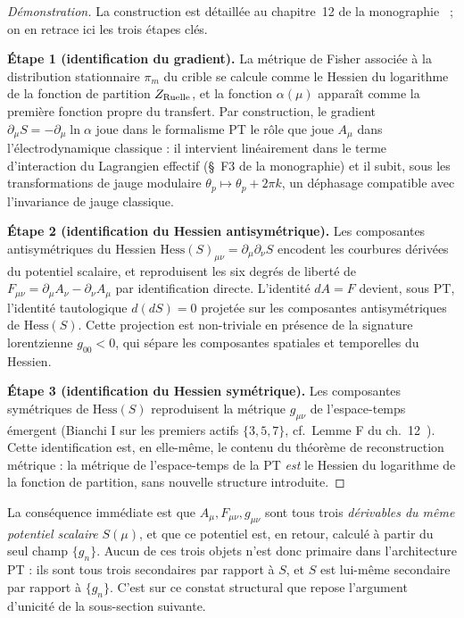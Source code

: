 \begin{proof}[Démonstration]
La construction est détaillée au chapitre~12 de la
monographie~\cite{PT_Monograph} ; on en retrace ici les trois
étapes clés.

\textbf{Étape 1 (identification du gradient).}
La métrique de Fisher associée à la distribution stationnaire
$\pi_m$ du crible se calcule comme le Hessien du logarithme de la
fonction de partition $Z_{\rm Ruelle}$, et la fonction
$\alpha(\mu)$ apparaît comme la première fonction propre du
transfert. Par construction, le gradient $\partial_\mu S =
-\partial_\mu \ln \alpha$ joue dans le formalisme PT le rôle que
joue $A_\mu$ dans l'électrodynamique classique : il intervient
linéairement dans le terme d'interaction du Lagrangien effectif
(\S~F3 de la monographie) et il subit, sous les transformations
de jauge modulaire $\theta_p \mapsto \theta_p + 2\pi k$, un
déphasage compatible avec l'invariance de jauge classique.

\textbf{Étape 2 (identification du Hessien antisymétrique).}
Les composantes antisymétriques du Hessien
$\mathrm{Hess}(S)_{\mu\nu} = \partial_\mu \partial_\nu S$ encodent
les courbures dérivées du potentiel scalaire, et reproduisent les
six degrés de liberté de $F_{\mu\nu} = \partial_\mu A_\nu -
\partial_\nu A_\mu$ par identification directe. L'identité
$dA = F$ devient, sous PT, l'identité tautologique
$d(dS) = 0$ projetée sur les composantes antisymétriques de
$\mathrm{Hess}(S)$. Cette projection est non-triviale en présence
de la signature lorentzienne $g_{00} < 0$, qui sépare les
composantes spatiales et temporelles du Hessien.

\textbf{Étape 3 (identification du Hessien symétrique).}
Les composantes symétriques de $\mathrm{Hess}(S)$ reproduisent la
métrique $g_{\mu\nu}$ de l'espace-temps émergent (Bianchi I sur
les premiers actifs $\{3, 5, 7\}$, cf.\ Lemme F du
ch.~12~\cite{PT_Monograph}). Cette identification est, en
elle-même, le contenu du théorème de reconstruction métrique :
la métrique de l'espace-temps de la PT \emph{est} le Hessien du
logarithme de la fonction de partition, sans nouvelle structure
introduite.
\end{proof}

La conséquence immédiate est que $A_\mu, F_{\mu\nu}, g_{\mu\nu}$
sont tous trois \emph{dérivables du même potentiel scalaire}
$S(\mu)$, et que ce potentiel est, en retour, calculé à partir du
seul champ $\{g_n\}$. Aucun de ces trois objets n'est donc
primaire dans l'architecture PT : ils sont tous trois secondaires
par rapport à $S$, et $S$ est lui-même secondaire par rapport à
$\{g_n\}$. C'est sur ce constat structural que repose
l'argument d'unicité de la sous-section suivante.

